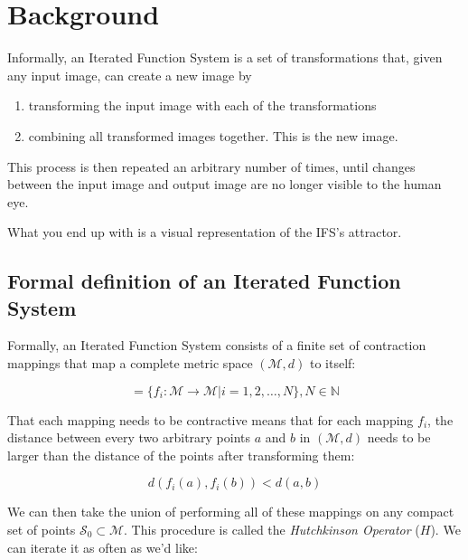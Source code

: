 \documentclass[11pt]{article}
\begin{document}

\section{Background}
\label{sec:orge6880d4}
\label{section:background}

Informally, an Iterated Function System is a set of transformations that, given any input image, can create a new image by

\begin{enumerate}
\item transforming the input image with each of the transformations
\item combining all transformed images together. This is the new image.
\end{enumerate}

This process is then repeated an arbitrary number of times, until changes between the input image and output image are no longer visible to the human eye.

What you end up with is a visual representation of the IFS's attractor.




\subsection{Formal definition of an Iterated Function System}
\label{sec:org2480645}

Formally, an Iterated Function System consists of a finite set of contraction mappings that map a complete metric space \((\mathcal{M}, d)\) to itself:

$$ = \{ f_i : \mathcal{M} \rightarrow \mathcal{M} | i = 1, 2, \ldots, N \}, N \in \mathbb{N}$$

That each mapping needs to be contractive means that for each mapping \(f_i\), the distance between every two arbitrary points \(a\) and \(b\) in \((\mathcal{M}, d)\) needs to be larger than the distance of the points after transforming them:

$$d(f_i(a), f_i(b)) < d(a, b)$$

We can then take the union of performing all of these mappings on any compact set of points \(\mathcal{S}_0 \subset \mathcal{M}\). This procedure is called the \emph{Hutchkinson Operator} (\(H\)). 
We can iterate it as often as we'd like:
\end{document}
